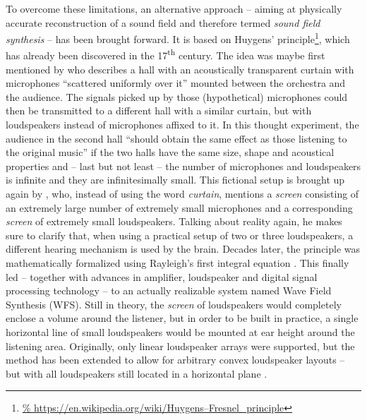 To overcome these limitations, an alternative approach
-- aiming at physically accurate reconstruction of a sound field
and therefore termed \emph{sound field synthesis} --
has been brought forward.
It is based on Huygens' principle\footnote{\url{%
https://en.wikipedia.org/wiki/Huygens–Fresnel_principle}},
which has
already been discovered in the 17\textsuperscript{th} century.
The idea was maybe first mentioned by \textcite{fletcher1934basic}
who describes a hall with an acoustically transparent curtain
with microphones ``scattered uniformly over it''
mounted between the orchestra and the audience.
The signals picked up by those (hypothetical) microphones could then
be transmitted to a different hall with a similar curtain,
but with loudspeakers instead of microphones affixed to it.
In this thought experiment,
the audience in the second hall
``should obtain the same effect
as those listening to the original music''
if the two halls have the same
size, shape and acoustical properties and
-- last but not least --
the number of microphones and loudspeakers is infinite
and they are infinitesimally small.
This fictional setup is brought up again by
\textcite{snow1953stereo},
who, instead of using the word \emph{curtain},
mentions a \emph{screen} consisting of an extremely large number of
extremely small microphones
and a corresponding \emph{screen} of extremely small loudspeakers.
Talking about reality again,
he makes sure to clarify that, when using a practical setup
of two or three loudspeakers,
a different hearing mechanism
is used by the brain.
Decades later,
the principle was mathematically formalized using
Rayleigh's first integral equation
\parencite{berkhout1988holographic,berkhout1993acoustic}.
This finally led
-- together with advances in amplifier, loudspeaker
and digital signal processing technology --
to an actually realizable system
named Wave Field Synthesis (WFS).
Still in theory,
the \emph{screen} of loudspeakers would completely enclose
a volume around the listener,
but in order to be built in practice,
a single horizontal line
of small loudspeakers would be mounted at ear height
around the listening area.
Originally,
only linear loudspeaker arrays were supported,
but the method has been extended to allow for
arbitrary convex
loudspeaker layouts
-- but with all loudspeakers still located in a horizontal plane
\parencite{spors2008wfs}.

